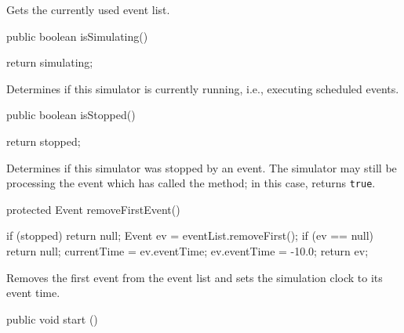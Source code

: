 \begin{tabb}  Gets the currently used event list.
\end{tabb}
\begin{htmlonly}
\end{htmlonly}
\begin{code}

   public boolean isSimulating()\begin{hide} {
       return simulating;
   }\end{hide}
\end{code}
\begin{tabb}  Determines if this simulator is currently running, i.e.,
  executing scheduled events.
\end{tabb}
\begin{code}

   public boolean isStopped()\begin{hide} {
       return stopped;
   }\end{hide}
\end{code}
\begin{tabb}  Determines if this simulator was stopped by
  an event.  The simulator may still be processing the event which
  has called the  method; in this case,
   returns \texttt{true}.
\end{tabb}
\begin{code}

   protected Event removeFirstEvent()\begin{hide} {
       if (stopped)
          return null;
       Event ev = eventList.removeFirst();
       if (ev == null)
          return null;
       currentTime = ev.eventTime;
       ev.eventTime = -10.0;
       return ev;
   }\end{hide}
\end{code}
\begin{tabb}  Removes the first event from the event list and sets the simulation
  clock to its event time.
\end{tabb}
\begin{htmlonly}
\end{htmlonly}
\begin{code}

   public void start () \begin{hide} {
      if (eventList.isEmpty()) 
        throw new IllegalStateException ("start() called with an empty event list");
      stopped = false;
      simulating = true;
      Event ev;
      try {
         while ((ev = removeFirstEvent()) != null && !stopped) {
   //      while (!stopped && (ev = eventList.removeFirst()) != null) {
   //          currentTime = ev.eventTime;
   //          ev.eventTime = -10.0;
             ev.actions(); 
             // if ev is a thread object associated to a process,
             // the control will be transfered to this thread and the
             // executive will be passivated in the actions() method.
         }
      }
      finally {
         stopped = true; simulating = false;
      }
   }\end{hide}
\end{code}
